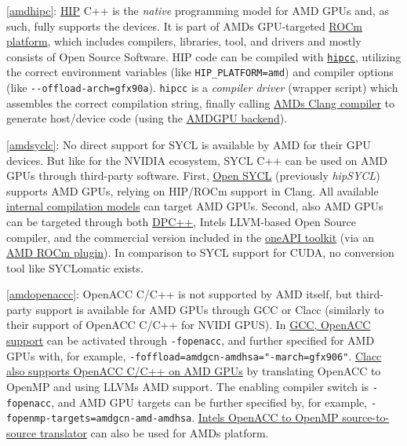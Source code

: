 \item \ref{amdhipc}: \href{https://github.com/ROCm-Developer-Tools/HIP}{HIP} C++ is the \emph{native} programming model for AMD GPUs and, as such, fully supports the devices. It is part of AMD\textquotesingle s GPU-targeted \href{https://rocm.docs.amd.com/en/latest/}{ROCm platform}, which includes compilers, libraries, tool, and drivers and mostly consists of Open Source Software. HIP code can be compiled with \href{https://github.com/ROCm-Developer-Tools/HIPCC}{\texttt{hipcc}}, utilizing the correct environment variables (like \texttt{HIP\_PLATFORM=amd}) and compiler options (like \texttt{-\/-offload-arch=gfx90a}). \texttt{hipcc} is a \emph{compiler driver} (wrapper script) which assembles the correct compilation string, finally calling \href{https://github.com/RadeonOpenCompute/llvm-project}{AMD\textquotesingle s Clang compiler} to generate host/device code (using the \href{https://llvm.org/docs/AMDGPUUsage.html}{AMDGPU backend}).
\item \ref{amdsyclc}: No direct support for SYCL is available by AMD for their GPU devices. But like for the NVIDIA ecosystem, SYCL C++ can be used on AMD GPUs through third-party software. First, \href{https://github.com/OpenSYCL/OpenSYCL}{Open SYCL} (previously \emph{hipSYCL}) supports AMD GPUs, relying on HIP/ROCm support in Clang. All available \href{https://github.com/OpenSYCL/OpenSYCL/blob/develop/doc/compilation.md}{internal compilation models} can target AMD GPUs. Second, also AMD GPUs can be targeted through both \href{https://github.com/intel/llvm/blob/sycl/sycl/doc/GetStartedGuide.md\#build-dpc-toolchain-with-support-for-hip-amd}{DPC++}, Intel\textquotesingle s LLVM-based Open Source compiler, and the commercial version included in the \href{https://www.intel.com/content/www/us/en/developer/tools/oneapi/dpc-compiler.html}{oneAPI toolkit} (via an \href{https://developer.codeplay.com/products/oneapi/amd/2023.2.1/guides/get-started-guide-amd}{AMD ROCm plugin}). In comparison to SYCL support for CUDA, no conversion tool like SYCLomatic exists.
\item \ref{amdopenaccc}: OpenACC C/C++ is not supported by AMD itself, but third-party support is available for AMD GPUs through GCC or Clacc (similarly to their support of OpenACC C/C++ for NVIDI GPUS). In \href{https://gcc.gnu.org/wiki/Offloading}{GCC, OpenACC support} can be activated through \texttt{-fopenacc}, and further specified for AMD GPUs with, for example, \texttt{-foffload=amdgcn-amdhsa="-march=gfx906"}. \href{https://csmd.ornl.gov/project/clacc}{Clacc also supports OpenACC C/C++ on AMD GPUs} by translating OpenACC to OpenMP and using LLVM\textquotesingle s AMD support. The enabling compiler switch is \texttt{-fopenacc}, and AMD GPU targets can be further specified by, for example, \texttt{-fopenmp-targets=amdgcn-amd-amdhsa}. \href{/\%22https://github.com/intel/intel-application-migration-tool-for-openacc-to-openmp/\%22}{Intel\textquotesingle s OpenACC to OpenMP source-to-source translator} can also be used for AMD\textquotesingle s platform.

